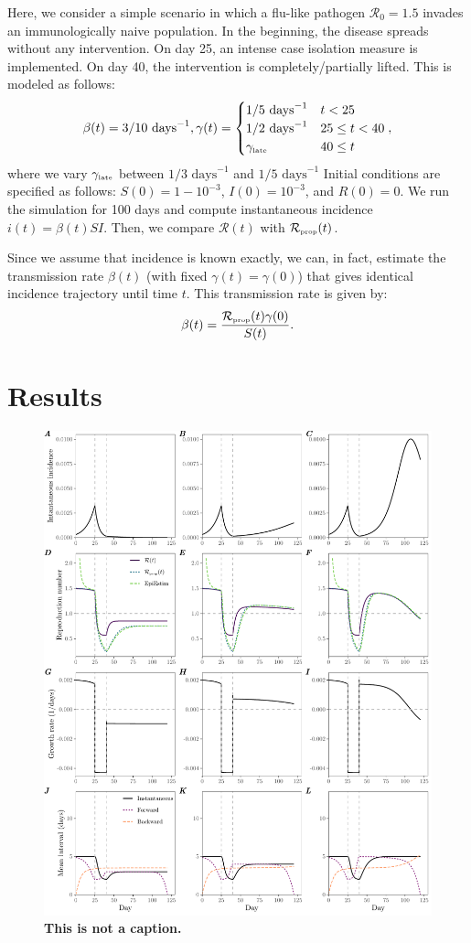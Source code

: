 \documentclass[12pt]{article}
\newcommand{\Rx}[1]{\ensuremath{{\mathcal R}_{#1}}\xspace}
\newcommand{\Ro}{\Rx{0}}
\newcommand{\RR}{\ensuremath{{\mathcal R}}\xspace}
\newcommand{\tsub}[2]{#1_{{\textrm{\tiny #2}}}}
\begin{document}
Here, we consider a simple scenario in which a flu-like pathogen $\Ro = 1.5$ invades an immunologically naive population.
In the beginning, the disease spreads without any intervention.
On day 25, an intense case isolation measure is implemented. 
On day 40, the intervention is completely/partially lifted.
This is modeled as follows:
\begin{equation}
\beta(t) = 3/10\,\,\textrm{days}^{-1}, \gamma(t) = \begin{cases}
1/5\,\, \textrm{days}^{-1} & t < 25\\
1/2\,\, \textrm{days}^{-1} & 25 \leq t < 40 \\
\tsub{\gamma}{late} & 40 \leq t
\end{cases},
\end{equation}
where we vary $\tsub{\gamma}{late}$ between $1/3\,\, \textrm{days}^{-1}$ and $1/5\,\, \textrm{days}^{-1}$
Initial conditions are specified as follows: $S(0) = 1 - 10^{-3}$, $I(0) = 10^{-3}$, and $R(0) = 0$.
We run the simulation for 100 days and compute instantaneous incidence $i(t) = \beta(t) S I$. 
Then, we compare $\RR(t)$ with $\tsub{\RR}{prop}(t)$.

Since we assume that incidence is known exactly, we can, in fact, estimate the transmission rate $\beta(t)$ (with fixed $\gamma(t)=\gamma(0)$) that gives identical incidence trajectory until time $t$.
This transmission rate is given by:
\begin{equation}
\beta(t) = \frac{\tsub{\RR}{prop}(t)\gamma(0)}{S(t)}.
\end{equation}

\section{Results}

\begin{figure}
\includegraphics[width=\textwidth]{figure_sir_semi.pdf}
\caption{
\textbf{This is not a caption.}
}
\end{figure}
\end{document}
